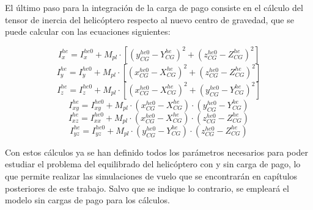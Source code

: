 El último paso para la integración de la carga de pago consiste en el cálculo del tensor de inercia del helicóptero respecto al nuevo centro de gravedad, que se puede calcular con las ecuaciones siguientes:

\begin{equation}
I_x^{he}=I_x^{he0}+M_{pl}\cdot[(y_{CG}^{he0}-Y_{CG}^{he})^2+(z_{CG}^{he0}-Z_{CG}^{he})^2]
\end{equation}
\begin{equation}
I_y^{he}=I_y^{he0}+M_{pl}\cdot[(x_{CG}^{he0}-X_{CG}^{he})^2+(z_{CG}^{he0}-Z_{CG}^{he})^2]
\end{equation}
\begin{equation}
I_z^{he}=I_z^{he0}+M_{pl}\cdot[(x_{CG}^{he0}-X_{CG}^{he})^2+(y_{CG}^{he0}-Y_{CG}^{he})^2]
\end{equation}
\begin{equation}
I_{xy}^{he}=I_{xy}^{he0}+M_{pl}\cdot(x_{CG}^{he0}-X_{CG}^{he})\cdot(y_{CG}^{he0}-Y_{CG}^{he})
\end{equation}
\begin{equation}
I_{xz}^{he}=I_{xx}^{he0}+M_{pl}\cdot(x_{CG}^{he0}-X_{CG}^{he})\cdot(z_{CG}^{he0}-Z_{CG}^{he})
\end{equation}
\begin{equation}
I_{yz}^{he}=I_{yz}^{he0}+M_{pl}\cdot(y_{CG}^{he0}-Y_{CG}^{he})\cdot(z_{CG}^{he0}-Z_{CG}^{he})
\end{equation}

Con estos cálculos ya se han definido todos los parámetros necesarios para poder estudiar el problema del equilibrado del helicóptero con y sin carga de pago, lo que permite realizar las simulaciones de vuelo que se encontrarán en capítulos posteriores de este trabajo. Salvo que se indique lo contrario, se empleará el modelo sin cargas de pago para los cálculos.
